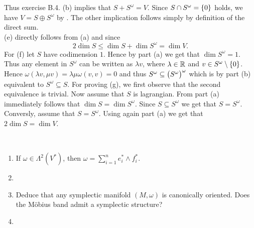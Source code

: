 \begin{solution}
Thus exercise B.4. (b) \cite[620]{lee:smooth_manifolds:2013} implies that $S + S^\omega = V$. Since $S \cap S^\omega = \cbr[0]{0}$ holds, we have $V = S \oplus S^\omega$ by \cite[101]{fischer:lineare_algebra:2014}. The other implication follows simply by definition of the direct sum.\\
(e) directly follows from (a) and \cite[620]{lee:smooth_manifolds:2013} since
\begin{equation*}
2\dim S \leq \dim S + \dim S^\omega = \dim V.
\end{equation*}
For (f) let $S$ have codimension $1$. Hence by part (a) we get that $\dim S^\omega = 1$. Thus any element in $S^\omega$ can be written as $\lambda v$, where $\lambda \in \mathbb{R}$ and $v \in S^\omega \setminus \cbr[0]{0}$. Hence $\omega(\lambda v, \mu v) =  \lambda\mu \omega(v,v) = 0$ and thus $S^\omega \subseteq \del[1]{S^\omega}^\omega$ which is by part (b) equivalent to $S^\omega \subseteq S$. For proving (g), we first observe that the second equivalence is trivial. Now assume that $S$ is lagrangian. From part (a) immediately follows that $\dim S = \dim S^\omega$. Since $S \subseteq S^\omega$ we get that $S = S^\omega$. Conversly, assume that $S = S^\omega$. Using again part (a) we get that $2\dim S = \dim V$.
\end{solution}

\begin{exercise}
~
\begin{enumerate}[label = \textup{(}\alph*\textup{)}]
\item If $\omega \in \Lambda^2(V^*)$, then $\omega = \sum_{i = 1}^n e^*_i \wedge f^*_i$.
\item
\item Deduce that any symplectic manifold $(M,\omega)$ is canonically oriented. Does the M\"obius band admit a symplectic structure?
\item
\end{enumerate}
\label{ex:orientable}
\end{exercise}

